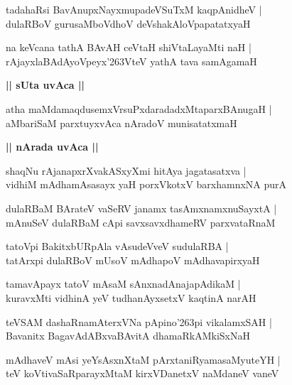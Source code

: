 \documentclass[twoside,12pt,openright]{book}
\def\S{\char'263}
\newcounter{shloka}[chapter]
\def\uvaca#1{\centerline{{\large\textbf{#1}}}}
\begin{document}
\begin{shloka}%
tadahaRsi BavAnupxNayxmupadeVSuTxM kaqpAnidheV |\\
dulaRBoV gurusaMboVdhoV deVshakAloVpapatatxyaH 
\end{shloka}

\begin{shloka}%
na keVcana tathA BAvAH ceVtaH shiVtaLayaMti naH |\\
rAjayxlaBAdAyoVpeyx\S VteV yathA tava samAgamaH 
\end{shloka}

\uvaca{|| sUta uvAca ||}

\begin{shloka}%
atha maMdamaqdusemxVrsuPxdaradadxMtaparxBAnugaH |\\
aMbariSaM parxtuyxvAca nAradoV munisatatxmaH 
\end{shloka}

\uvaca{|| nArada uvAca ||}

\begin{shloka}%
shaqNu rAjanapxrXvakASxyXmi hitAya jagatasatxva |\\
vidhiM mAdhamAsasayx yaH porxVkotxV barxhamnxNA purA 
\end{shloka}

\begin{shloka}%
dulaRBaM BArateV vaSeRV janamx tasAmxnamxnuSayxtA |\\
mAnuSeV dulaRBaM cApi savxsavxdhameRV parxvataRnaM 
\end{shloka}

\begin{shloka}%
tatoVpi BakitxbURpAla vAsudeVveV sudulaRBA |\\
tatArxpi dulaRBoV mUsoV mAdhapoV mAdhavapirxyaH 
\end{shloka}

\begin{shloka}%
tamavApayx tatoV mAsaM sAnxnadAnajapAdikaM |\\
kuravxMti vidhinA yeV tudhanAyxsetxV kaqtinA narAH 
\end{shloka}

\begin{shloka}%
teVSAM dashaRnamAterxVNa pApino\S pi vikalamxSAH |\\
Bavanitx BagavAdABxvaBAvitA dhamaRkAMkiSxNaH 
\end{shloka}

\begin{shloka}%
mAdhaveV mAsi yeYsAsxnXtaM pArxtaniRyamasaMyuteYH |\\
teV koVtivaSaRparayxMtaM kirxVDanetxV naMdaneV vaneV
\end{shloka}
\end{document}
